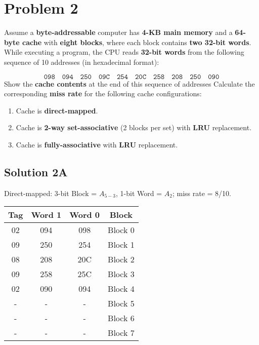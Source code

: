 \documentclass{article}
\begin{document}
\section*{Problem 2}
Assume a \textbf{byte-addressable} computer has \textbf{4-KB main memory} and a \textbf{64-byte cache} with \textbf{eight blocks}, where each block contains \textbf{two 32-bit words}. While executing a program, the CPU reads \textbf{32-bit words} from the following sequence of 10 addresses (in hexadecimal format):

\[
\texttt{098} \quad \texttt{094} \quad \texttt{250} \quad \texttt{09C} \quad \texttt{254} \quad \texttt{20C} \quad \texttt{258} \quad \texttt{208} \quad \texttt{250} \quad \texttt{090}
\]
Show the \textbf{cache contents} at the end of this sequence of addresses Calculate the corresponding \textbf{miss rate} for the following cache configurations:
    \begin{enumerate}
        \item Cache is \textbf{direct-mapped}.
        \item Cache is \textbf{2-way set-associative} (2 blocks per set) with \textbf{LRU} replacement.
        \item Cache is \textbf{fully-associative} with \textbf{LRU} replacement.
    \end{enumerate}

\subsection*{Solution 2A} Direct-mapped: 3-bit Block = $A_{5-3}$, 1-bit Word = $A_2$; miss rate = 8/10.

\begin{center}
\begin{tabular}{|c|c|c|c|}
\hline
Tag & Word 1 & Word 0 & Block \\\hline
02 & 094 & 098 & Block 0 \\\hline
09 & 250 & 254 & Block 1 \\\hline
08 & 208 & 20C & Block 2 \\\hline
09 & 258 & 25C & Block 3 \\\hline
02 & 090 & 094 & Block 4 \\\hline
- & - & - & Block 5 \\\hline
- & - & - & Block 6 \\\hline
- & - & - & Block 7 \\\hline
\end{tabular}
\end{center}
\end{document}

